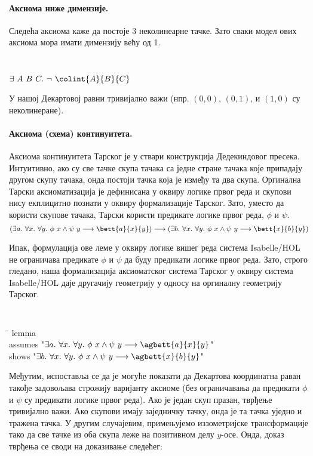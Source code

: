 \paragraph{Аксиома ниже димензије.}
Следећа аксиома каже да постоје 3 неколинеарне тачке. Зато сваки модел
ових аксиома мора имати димензију већу од 1.

{\tt
\begin{tabbing}
$\exists\ A\ B\ C.\ \neg\ \colint{A}{B}{C}$
\end{tabbing}
}
\noindent У нашој Декартовој равни тривијално важи (нпр. $(0, 0)$,
$(0, 1)$, и $(1, 0)$ су неколинеране).

\paragraph{Аксиома (схема) континуитета.}

Аксиома континуитета Тарског је у ствари конструкција Дедекиндовог
пресека. Интуитивно, ако су све тачке скупа тачака са једне стране
тачака које припадају другом скупу тачака, онда постоји тачка која је
између та два скупа. Оргинална Тарски аксиоматизација је дефинисана у
оквиру логике првог реда и скупови нису екплицитно познати у оквиру
формализације Тарског. Зато, уместо да користи скупове тачака, Тарски
користи предикате логике првог реда, $\phi$ и $\psi$.
$$(\exists a.\ \forall x.\ \forall y.\ \phi\ x \wedge \psi\ y \longrightarrow \bett{a}{x}{y}) \longrightarrow (\exists b.\ \forall x.\ \forall y.\ \phi\ x \wedge \psi\ y \longrightarrow \bett{x}{b}{y})$$

Ипак, формулација ове леме у оквиру логике вишег реда система
Isabelle/HOL не ограничава предикате $\phi$ и $\psi$ да буду
предикати логике првог реда. Зато, строго гледано, наша формализација
аксиоматског система Тарског у оквиру система Isabelle/HOL даје
другачију геометрију у односу на оргиналну геометрију Тарског.

{\tt
\begin{tabbing}
\hspace{5mm}\=\kill
lemma\\
\>assumes "$\exists a.\ \forall x.\ \forall y.\ \phi\ x \wedge \psi\ y \longrightarrow \agbett{a}{x}{y}$"\\
\>shows "$\exists b.\ \forall x.\ \forall y.\ \phi\ x \wedge \psi\ y \longrightarrow \agbett{x}{b}{y}$"
\end{tabbing}
}

Међутим, испоставља се да је могуће показати да Декартова координатна
раван такође задовољава строжију варијанту аксиоме (без ограничавања
да предикати $\phi$ и $\psi$ су предикати логике првог реда). Ако је
један скуп празан, тврђење тривијално важи. Ако скупови имају
заједничку тачку, онда је та тачка уједно и тражена тачка. У другим
случајевим, примењујемо иззометријске трансформације тако да све тачке
из оба скупа леже на позитивном делу $y$-осе. Онда, доказ тврђења се
своди на доказивање следећег:

